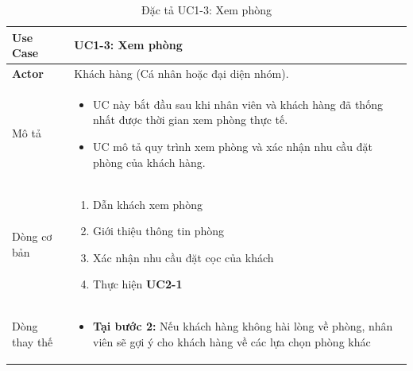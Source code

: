 \vspace{0.5cm}
\begin{table}[H]
    \centering
\begin{tabularx}{\textwidth}{|>{\centering\arraybackslash\bfseries}m{3.5cm}|X|}
    \hline
    Use Case & {\centering\textbf{UC1-3: Xem phòng}\par} \\ 
    \hline
     
    Actor & Khách hàng (Cá nhân hoặc đại diện nhóm). \\
    \hline

    Mô tả & 
    \begin{itemize}[leftmargin=*, nosep, label=-]
        \vspace{0.2cm}
        \item UC này bắt đầu sau khi nhân viên và khách hàng đã thống nhất được thời gian xem phòng thực tế.
        \item UC mô tả quy trình xem phòng và xác nhận nhu cầu đặt phòng của khách hàng.
    \end{itemize} \\ 
    \hline
     
    Dòng cơ bản & 
    \begin{enumerate}[leftmargin=*, nosep]
        \vspace{0.2cm}
        \item Dẫn khách xem phòng
        \item Giới thiệu thông tin phòng
        \item Xác nhận nhu cầu đặt cọc của khách
        \item Thực hiện \textbf{UC2-1}
    \end{enumerate} \\ 
    \hline
     
    Dòng thay thế & 
    \begin{itemize}[leftmargin=*, nosep, label=-]
        \vspace{0.2cm}
        \item \textbf{Tại bước 2:} Nếu khách hàng không hài lòng về phòng, nhân viên sẽ gợi ý cho khách hàng về các lựa chọn phòng khác
    \end{itemize} \\ 
    \hline
\end{tabularx}
\caption{Đặc tả UC1-3: Xem phòng}
\end{table}

\vspace{0.5cm}



